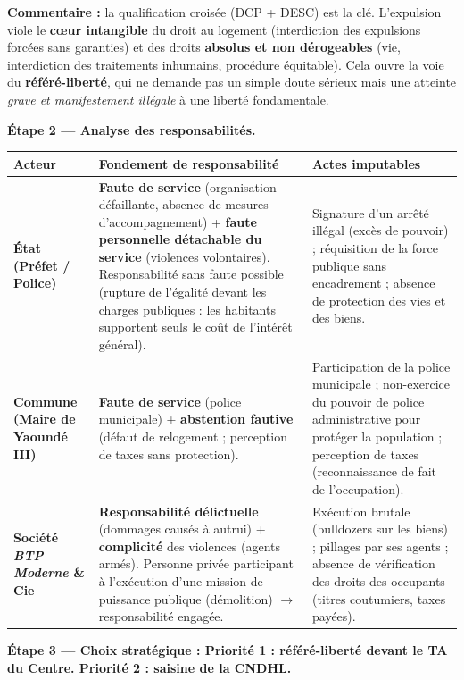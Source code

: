 \documentclass[11pt]{article}
\begin{document}
\begin{exoresolu}
\textbf{Commentaire :} la qualification croisée (DCP + DESC) est la clé. L'expulsion viole le \textbf{cœur intangible} du droit au logement (interdiction des expulsions forcées sans garanties) et des droits \textbf{absolus et non dérogeables} (vie, interdiction des traitements inhumains, procédure équitable). Cela ouvre la voie du \textbf{référé-liberté}, qui ne demande pas un simple doute sérieux mais une atteinte \emph{grave et manifestement illégale} à une liberté fondamentale.

\vspace{0.5cm}
\textbf{Étape 2 — Analyse des responsabilités.}

\begin{center}
\begin{tabularx}{\linewidth}{|l|X|X|}\hline
\textbf{Acteur} & \textbf{Fondement de responsabilité} & \textbf{Actes imputables} \\ \hline
\textbf{État (Préfet / Police)} & \textbf{Faute de service} (organisation défaillante, absence de mesures d'accompagnement) + \textbf{faute personnelle détachable du service} (violences volontaires). Responsabilité sans faute possible (rupture de l'égalité devant les charges publiques : les habitants supportent seuls le coût de l'intérêt général). & Signature d'un arrêté illégal (excès de pouvoir) ; réquisition de la force publique sans encadrement ; absence de protection des vies et des biens. \\ \hline
\textbf{Commune (Maire de Yaoundé III)} & \textbf{Faute de service} (police municipale) + \textbf{abstention fautive} (défaut de relogement ; perception de taxes sans protection). & Participation de la police municipale ; non-exercice du pouvoir de police administrative pour protéger la population ; perception de taxes (reconnaissance de fait de l'occupation). \\ \hline
\textbf{Société \emph{BTP Moderne} \& Cie} & \textbf{Responsabilité délictuelle} (dommages causés à autrui) + \textbf{complicité} des violences (agents armés). Personne privée participant à l'exécution d'une mission de puissance publique (démolition) $\rightarrow$ responsabilité engagée. & Exécution brutale (bulldozers sur les biens) ; pillages par ses agents ; absence de vérification des droits des occupants (titres coutumiers, taxes payées). \\ \hline
\end{tabularx}
\end{center}

\vspace{0.5cm}
\textbf{Étape 3 — Choix stratégique : Priorité 1 : référé-liberté devant le TA du Centre. Priorité 2 : saisine de la CNDHL.}


\end{exoresolu}
\end{document}
